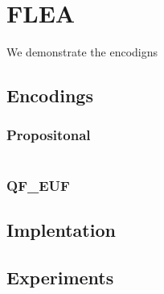
\chapter{FLEA}



We demonstrate the encodigns 

\section{Encodings}





\subsection{Propositonal}

\[ \]

\subsection{QF\_EUF}





\section{Implentation}


\section{Experiments}